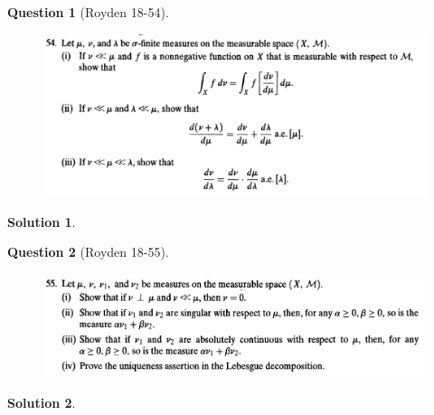 \documentclass{article} %
\theoremstyle{quest}
\newtheorem*{question}{Question}
\newtheorem*{solution}{Solution}
\begin{document}
\newpage

\begin{question}[Royden 18-54]
\hfill
\begin{figure}[h!]
  \centering
    \includegraphics[width=1\textwidth]{rv-18-54.png}
\end{figure}
\end{question}
\begin{solution}
\end{solution}
\newpage

\begin{question}[Royden 18-55]
\hfill
\begin{figure}[h!]
  \centering
    \includegraphics[width=1\textwidth]{rv-18-55.png}
\end{figure}
\end{question}
\begin{solution}
\end{solution}
\end{document}

